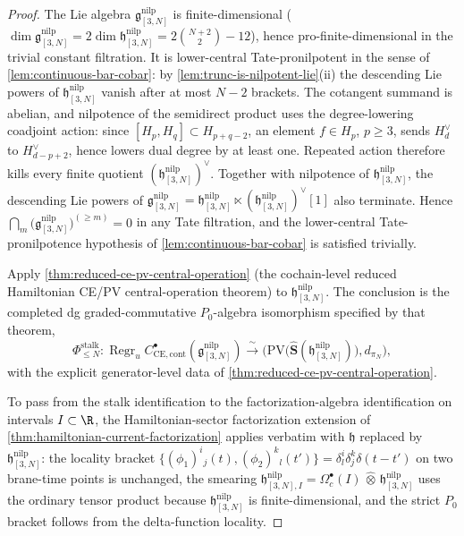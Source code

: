 \begin{proof}
The Lie algebra $\mathfrak g^{\mathrm{nilp}}_{[3,N]}$ is finite-dimensional
($\dim\mathfrak g^{\mathrm{nilp}}_{[3,N]}=2\dim\mathfrak h^{\mathrm{nilp}}_{[3,N]}=
2\binom{N+2}{2}-12$), hence pro-finite-dimensional in the trivial
constant filtration. It is lower-central Tate-pronilpotent in the sense of
\ref{lem:continuous-bar-cobar}: by
\ref{lem:trunc-is-nilpotent-lie}(ii) the descending Lie powers of
$\mathfrak h^{\mathrm{nilp}}_{[3,N]}$ vanish after at most $N-2$ brackets.  The
cotangent summand is abelian, and nilpotence of the semidirect product
uses the degree-lowering
coadjoint action: since \([H_p,H_q]\subset H_{p+q-2}\), an element
\(f\in H_p\), \(p\geq3\), sends \(H_d^\vee\) to
\(H_{d-p+2}^\vee\), hence lowers dual degree by at least one.  Repeated
action therefore kills every finite quotient
\((\mathfrak h^{\mathrm{nilp}}_{[3,N]})^\vee\).  Together with nilpotence of
\(\mathfrak h^{\mathrm{nilp}}_{[3,N]}\), the descending Lie powers of
\(\mathfrak g^{\mathrm{nilp}}_{[3,N]}=\mathfrak h^{\mathrm{nilp}}_{[3,N]}\ltimes
(\mathfrak h^{\mathrm{nilp}}_{[3,N]})^\vee[1]\) also terminate. Hence
$\bigcap_m\bigl(\mathfrak g^{\mathrm{nilp}}_{[3,N]}\bigr)^{(\geq m)}=0$ in any Tate
filtration, and the lower-central Tate-pronilpotence hypothesis of
\ref{lem:continuous-bar-cobar} is satisfied trivially.

Apply \ref{thm:reduced-ce-pv-central-operation} (the cochain-level reduced
Hamiltonian CE/PV central-operation theorem) to $\mathfrak h^{\mathrm{nilp}}_{[3,N]}$.
The conclusion is the completed dg graded-commutative \(P_0\)-algebra
isomorphism specified by that theorem,
$$\Phi_{\leq N}^{\mathrm{stalk}}:
  \operatorname{Regr}_u
  C^\bullet_{\mathrm{CE},\mathrm{cont}}(\mathfrak g^{\mathrm{nilp}}_{[3,N]})
  \xrightarrow{\ \sim\ }
  \bigl(
  \mathrm{PV}\bigl(\widehat{\mathbf S}(\mathfrak h^{\mathrm{nilp}}_{[3,N]})\bigr),
  d_{\pi_N}\bigr),$$
with the explicit generator-level data of
\ref{thm:reduced-ce-pv-central-operation}.

To pass from the stalk identification to the factorization-algebra
identification on intervals $I\subset\R$, the Hamiltonian-sector
factorization extension of \ref{thm:hamiltonian-current-factorization}
applies verbatim with $\mathfrak h$ replaced by
$\mathfrak h^{\mathrm{nilp}}_{[3,N]}$: the locality bracket
$\{(\phi_1)^i{}_j(t),(\phi_2)^k{}_l(t')\}=\delta^i_l\delta^k_j\delta(t-t')$
on two brane-time points is unchanged, the smearing
  $\mathfrak h^{\mathrm{nilp}}_{[3,N],I}=\Omega^\bullet_c(I)\,\widehat\otimes\,
  \mathfrak h^{\mathrm{nilp}}_{[3,N]}$ uses the ordinary tensor product because
\(\mathfrak h^{\mathrm{nilp}}_{[3,N]}\) is finite-dimensional, and the strict \(P_0\)
bracket follows from the delta-function locality.


\end{proof}
